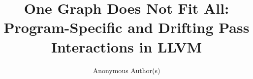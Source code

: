 \documentclass[sigplan,review,anonymous]{acmart}
\begin{document}
\title{One Graph Does Not Fit All: Program-Specific and Drifting Pass Interactions in LLVM}

\author{Anonymous Author(s)}



\maketitle











\end{document}
